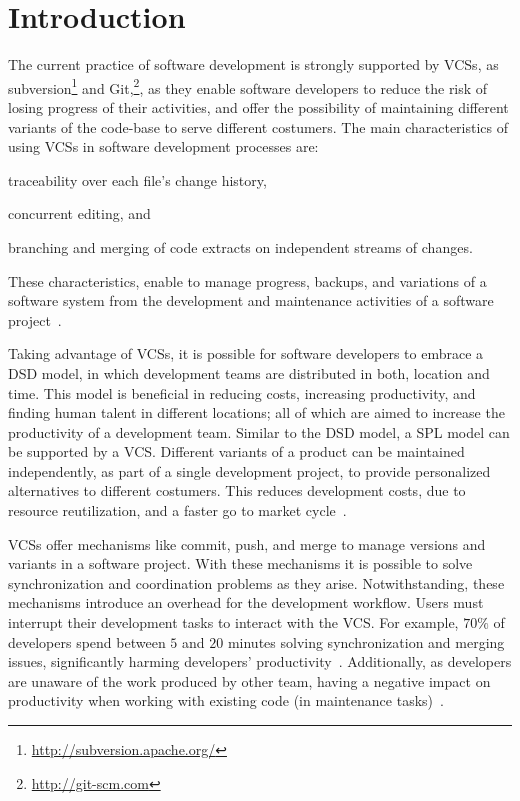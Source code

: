 
\section{Introduction}
\label{sec:introduction}

The current practice of software development is strongly supported by \acp{VCS}, as subversion\footnote{\url{http://subversion.apache.org/}} and Git,\footnote{\url{http://git-scm.com}}, as they enable software developers to reduce the risk of losing progress of their activities, and offer the possibility of maintaining different variants of the code-base to serve different costumers.
The main characteristics of using \acp{VCS} in software development processes are:
\begin{enumerate*}[label=(\arabic*)]
\item traceability over each file's change history, 
\item concurrent editing, and 
\item branching and merging of code extracts on independent streams of changes. 
\end{enumerate*}
These characteristics, enable to manage progress, backups, and variations of a software system from the development and maintenance activities of a software project~\cite{spinellis05}.

Taking advantage of \acp{VCS},  it is possible for software developers to embrace a \ac{DSD} model, in which development teams are distributed in both, location and time. This model is beneficial in reducing costs, increasing productivity, and finding human talent in different locations; all of which are aimed to increase the productivity of a development team. 
Similar to the \ac{DSD} model, a \ac{SPL} model can be supported by a \ac{VCS}. Different variants of a product can be maintained independently, as part of a single development project, to provide personalized alternatives to different costumers. This reduces development costs, due to resource reutilization, and a faster go to market cycle~\cite{pohl05}.  

\acp{VCS} offer mechanisms like commit, push, and merge to manage versions and variants in a software project. With these mechanisms it is possible to solve synchronization and coordination problems as they arise. 
Notwithstanding, these mechanisms introduce an overhead for the development workflow. Users must interrupt their development tasks to interact with the \ac{VCS}. For example, $70\%$ of developers spend between $5$ and  $20$ minutes solving synchronization and merging issues, significantly harming developers' productivity~\cite{estler14}. Additionally, as developers are unaware of the work produced by other team, having a negative impact on productivity when working with existing code (\eg in maintenance tasks)~\cite{dourish92}.

